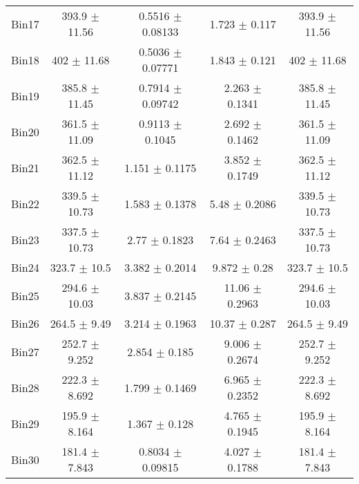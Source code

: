 \begin{tabular}{@{\extracolsep{4pt}}lcccc@{}}
     Bin17 & 393.9 $\pm$ 11.56 & 0.5516 $\pm$ 0.08133 & 1.723 $\pm$ 0.117 & 393.9 $\pm$ 11.56 \\ 
     Bin18 & 402 $\pm$ 11.68 & 0.5036 $\pm$ 0.07771 & 1.843 $\pm$ 0.121 & 402 $\pm$ 11.68 \\ 
     Bin19 & 385.8 $\pm$ 11.45 & 0.7914 $\pm$ 0.09742 & 2.263 $\pm$ 0.1341 & 385.8 $\pm$ 11.45 \\ 
     Bin20 & 361.5 $\pm$ 11.09 & 0.9113 $\pm$ 0.1045 & 2.692 $\pm$ 0.1462 & 361.5 $\pm$ 11.09 \\ 
     Bin21 & 362.5 $\pm$ 11.12 & 1.151 $\pm$ 0.1175 & 3.852 $\pm$ 0.1749 & 362.5 $\pm$ 11.12 \\ 
     Bin22 & 339.5 $\pm$ 10.73 & 1.583 $\pm$ 0.1378 & 5.48 $\pm$ 0.2086 & 339.5 $\pm$ 10.73 \\ 
     Bin23 & 337.5 $\pm$ 10.73 & 2.77 $\pm$ 0.1823 & 7.64 $\pm$ 0.2463 & 337.5 $\pm$ 10.73 \\ 
     Bin24 & 323.7 $\pm$ 10.5 & 3.382 $\pm$ 0.2014 & 9.872 $\pm$ 0.28 & 323.7 $\pm$ 10.5 \\ 
     Bin25 & 294.6 $\pm$ 10.03 & 3.837 $\pm$ 0.2145 & 11.06 $\pm$ 0.2963 & 294.6 $\pm$ 10.03 \\ 
     Bin26 & 264.5 $\pm$ 9.49 & 3.214 $\pm$ 0.1963 & 10.37 $\pm$ 0.287 & 264.5 $\pm$ 9.49 \\ 
     Bin27 & 252.7 $\pm$ 9.252 & 2.854 $\pm$ 0.185 & 9.006 $\pm$ 0.2674 & 252.7 $\pm$ 9.252 \\ 
     Bin28 & 222.3 $\pm$ 8.692 & 1.799 $\pm$ 0.1469 & 6.965 $\pm$ 0.2352 & 222.3 $\pm$ 8.692 \\ 
     Bin29 & 195.9 $\pm$ 8.164 & 1.367 $\pm$ 0.128 & 4.765 $\pm$ 0.1945 & 195.9 $\pm$ 8.164 \\ 
     Bin30 & 181.4 $\pm$ 7.843 & 0.8034 $\pm$ 0.09815 & 4.027 $\pm$ 0.1788 & 181.4 $\pm$ 7.843 \\ 
\hline\hline
  \end{tabular}
